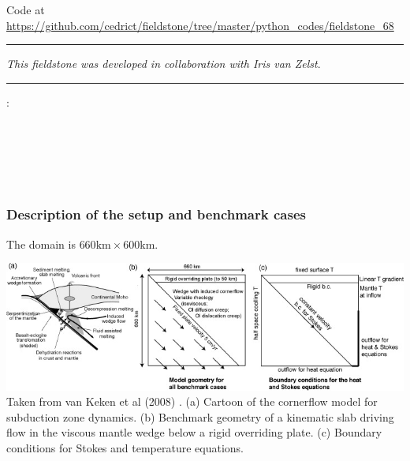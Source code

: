 

\begin{center}
Code at \url{https://github.com/cedrict/fieldstone/tree/master/python_codes/fieldstone_68}
\end{center}

\par\noindent\rule{\textwidth}{0.4pt}

{\sl This fieldstone was developed in collaboration with Iris van Zelst}. 

\par\noindent\rule{\textwidth}{0.4pt}



\Literature: \\
\textcite{vack08}\\
\textcite{syva10}\\
\textcite{vakn12}\\
\textcite{vaws19}\\
\textcite{enma21}\\
\textcite{gadm22}

\subsubsection*{Description of the setup and benchmark cases}


The domain is $660\text{km}\times 600\text{km}$. 

\begin{center}
\includegraphics[width=14cm]{python_codes/fieldstone_68/images/fig1}\\
{\captionfont Taken from van Keken et al (2008) \cite{vack08}.
(a) Cartoon of the cornerflow model for subduction zone dynamics. 
(b) Benchmark geometry of a kinematic slab driving flow in the viscous
mantle wedge below a rigid overriding plate. 
(c) Boundary conditions for Stokes and temperature equations.}
\end{center}

